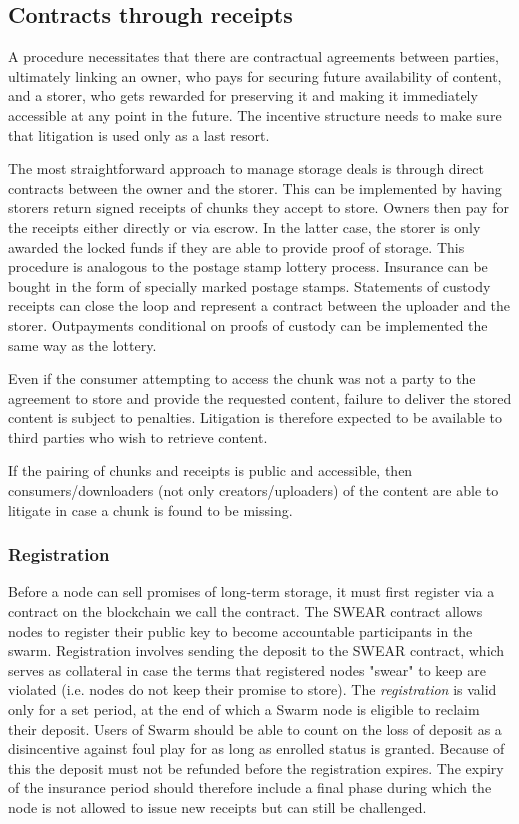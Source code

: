 \subsection{Contracts through receipts}

A  procedure necessitates that there are contractual agreements between parties, ultimately linking an owner, who pays for securing future availability of content, and a storer, who gets rewarded for preserving it and making it immediately accessible at any point in the future. The incentive structure needs to make sure that litigation is used only as a last resort.

The most straightforward approach to manage storage deals is through direct contracts between the owner and the storer. This can be implemented by having storers return signed receipts of chunks they accept to store. Owners then pay for the receipts either directly or via escrow. In the latter case, the storer is only awarded the locked funds if they are able to provide proof of storage. This procedure is analogous to the postage stamp lottery process. Insurance can be bought in the form of specially marked postage stamps. Statements of custody receipts can close the loop and represent a contract between the uploader and the storer. Outpayments conditional on proofs of custody can be implemented the same way as the lottery.

Even if the consumer attempting to access the chunk was not a party to the agreement to store and provide the requested content, failure to deliver the stored content is subject to penalties. Litigation is therefore expected to be available to third parties who wish to retrieve content.

If the pairing of chunks and receipts is public and accessible, then consumers/downloaders (not only creators/uploaders) of the content are able to litigate in case a chunk is found to be missing. 

\subsubsection{Registration}

Before a node can sell promises of long-term storage, it must first register via a contract on the blockchain we call the  contract. The SWEAR contract allows nodes to register their public key to become accountable participants in the swarm. Registration involves sending the deposit to the SWEAR contract, which serves as collateral in case the terms that registered nodes "swear" to keep are violated (i.e. nodes do not keep their promise to store). The \emph{registration} is valid only for a set period, at the end of which a Swarm node is eligible to reclaim their deposit. Users of Swarm should be able to count on the loss of deposit as a disincentive against foul play for as long as enrolled status is granted. Because of this the deposit must not be refunded before the registration expires. The expiry of the insurance period should therefore include a final phase during which the node is not allowed to issue new receipts but can still be challenged.

